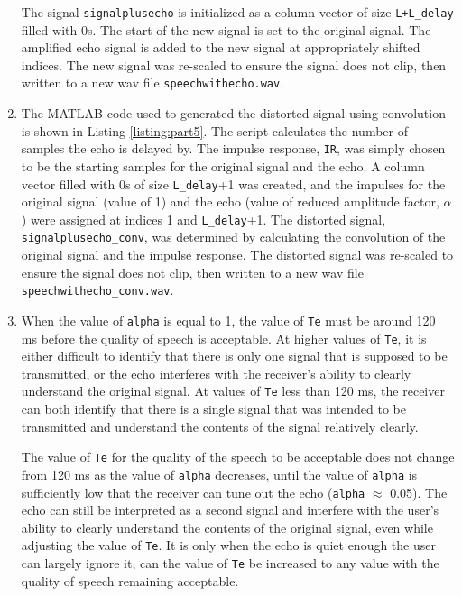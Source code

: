 \documentclass[12pt]{article}
\begin{document}
\begin{enumerate}
    The signal \verb|signalplusecho| is initialized as a column vector of size \verb|L+L_delay| filled with 0s. The start of the new signal is set to the original signal. The amplified echo signal is added to the new signal at appropriately shifted indices. The new signal was re-scaled to ensure the signal does not clip, then written to a new wav file \verb|speechwithecho.wav|.

    
    
    \item
    The MATLAB code used to generated the distorted signal using convolution is shown in Listing \ref{listing:part5}. The script calculates the number of samples the echo is delayed by. The impulse response, \verb|IR|, was simply chosen to be the starting samples for the original signal and the echo. A column vector filled with 0s of size \verb|L_delay|+1 was created, and the impulses for the original signal (value of 1) and the echo (value of reduced amplitude factor, $\alpha$) were assigned at indices 1 and \verb|L_delay|+1. The distorted signal, \verb|signalplusecho_conv|, was determined by calculating the convolution of the original signal and the impulse response. The distorted signal was re-scaled to ensure the signal does not clip, then written to a new wav file \verb|speechwithecho_conv.wav|. 

    

    \item
    When the value of \verb|alpha| is equal to 1, the value of \verb|Te| must be around 120 ms before the quality of speech is acceptable. At higher values of \verb|Te|, it is either difficult to identify that there is only one signal that is supposed to be transmitted, or the echo interferes with the receiver's ability to clearly understand the original signal. At values of \verb|Te| less than 120 ms, the receiver can both identify that there is a single signal that was intended to be transmitted and understand the contents of the signal relatively clearly.

    The value of \verb|Te| for the quality of the speech to be acceptable does not change from 120 ms as the value of \verb|alpha| decreases, until the value of \verb|alpha| is sufficiently low that the receiver can tune out the echo (\verb|alpha| $\approx$ 0.05). The echo can still be interpreted as a second signal and interfere with the user's ability to clearly understand the contents of the original signal, even while adjusting the value of \verb|Te|. It is only when the echo is quiet enough the user can largely ignore it, can the value of \verb|Te| be increased to any value with the quality of speech remaining acceptable.


\end{enumerate}
\end{document}
